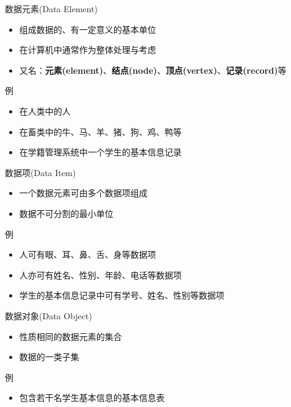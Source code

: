 \begin{frame}{\insertsubsectionhead}
	\begin{block}{数据元素(Data Element)}
		\begin{itemize}
			\item 组成数据的、有一定意义的\alert{基本}单位
			\item 在计算机中通常作为\alert{整体}处理与考虑
			\item 又名：\textbf{元素(element)}、\textbf{结点(node)}、\textbf{顶点(vertex)}、\textbf{记录(record)}等
		\end{itemize}
	\end{block}
	\pause
	\begin{exampleblock}{例}
		\begin{itemize}
			\item 在人类中的\alert{人}
			\item 在畜类中的\alert{牛、马、羊、猪、狗、鸡、鸭}等
			\item 在学籍管理系统中一个学生的\alert{基本信息记录}
		\end{itemize}
	\end{exampleblock}
\end{frame}

\begin{frame}{\insertsubsectionhead}
	\begin{block}{数据项(Data Item)}
		\begin{itemize}
			\item 一个数据元素可由多个数据项组成
			\item 数据不可分割的\alert{最小}单位
		\end{itemize}
	\end{block}
	\pause
	\begin{exampleblock}{例}
		\begin{itemize}
			\item 人可有\alert{眼、耳、鼻、舌、身}等数据项
			\item 人亦可有\alert{姓名、性别、年龄、电话}等数据项
			\item 学生的基本信息记录中可有\alert{学号、姓名、性别}等数据项
		\end{itemize}
	\end{exampleblock}
\end{frame}

\begin{frame}{\insertsubsectionhead}
	\begin{block}{数据对象(Data Object)}
		\begin{itemize}
			\item \alert{性质相同}\footnotemark{}的数据元素的集合
			\item 数据的一类子集
		\end{itemize}
	\end{block}
	\pause
	\begin{exampleblock}{例}
		\begin{itemize}
			\item 包含若干名学生基本信息的\alert{基本信息表}
		\end{itemize}
	\end{exampleblock}
\end{frame}

